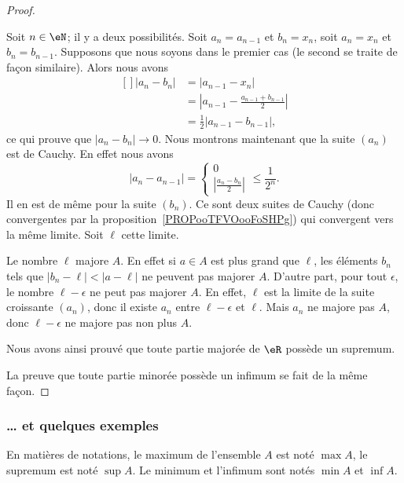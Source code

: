\begin{proof}
\begin{subproof}
	Soit $n\in\eN$; il y a deux possibilités. Soit $a_n=a_{n-1}$ et $b_n=x_n$, soit $a_n=x_n$ et $b_n=b_{n-1}$. Supposons que nous soyons dans le premier cas (le second se traite de façon similaire). Alors nous avons
	\begin{equation}
		\begin{aligned}[]
			| a_n-b_n |&=| a_{n-1}-x_n |\\
			&=\left| a_{n-1}-\frac{ a_{n-1}+b_{n-1} }{2} \right| \\
			&=\frac{ 1 }{2}| a_{n-1}-b_{n-1} |,
		\end{aligned}
	\end{equation}
	ce qui prouve que $| a_n-b_n |\to 0$. Nous montrons maintenant que la suite \( (a_n)\) est de Cauchy. En effet nous avons
    \begin{equation}
        | a_n-a_{n-1} |=\begin{cases}
          0\\
          \left| \frac{ a_n -b_n}{ 2} \right|
      \end{cases}\leq \frac{1}{ 2^n }.
    \end{equation}
    Il en est de même pour la suite \( (b_n)\). Ce sont deux suites de Cauchy (donc convergentes par la proposition~\ref{PROPooTFVOooFoSHPg}) qui convergent vers la même limite. Soit \( \ell\) cette limite.

	Le nombre $\ell$ majore $A$. En effet si $a\in A$ est plus grand que $\ell$, les éléments $b_n$ tels que $| b_n-\ell |<| a-\ell |$ ne peuvent pas majorer $A$. D'autre part, pour tout $\epsilon$, le nombre $\ell-\epsilon$ ne peut pas majorer $A$. En effet, $\ell$ est la limite de la suite croissante $(a_n)$, donc il existe $a_n$ entre $\ell-\epsilon$ et $\ell$. Mais $a_n$ ne majore pas $A$, donc $\ell-\epsilon$ ne majore pas non plus $A$.

	Nous avons ainsi prouvé que toute partie majorée de $\eR$ possède un supremum.
    \end{subproof}

    La preuve que toute partie minorée possède un infimum se fait de la même façon.
\end{proof}

\subsubsection{\dots{} et quelques exemples}

En matières de notations, le maximum de l'ensemble $A$ est noté $\max A$, le supremum est noté $\sup A$. Le minimum et l'infimum sont notés $\min A$ et $\inf A$.

